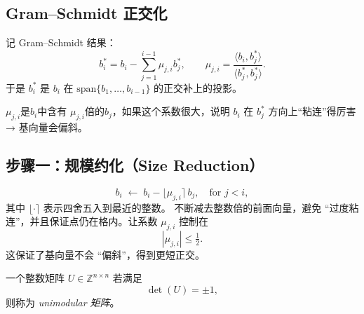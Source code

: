 \subsection*{Gram--Schmidt 正交化}
记 Gram--Schmidt 结果：
\[
b_i^* = b_i - \sum_{j=1}^{i-1} \mu_{j,i} b_j^*, 
\qquad 
\mu_{j,i} = \frac{\langle b_i, b_j^* \rangle}{\langle b_j^*, b_j^* \rangle}.
\]
于是 $b_i^*$ 是 $b_i$ 在 $\mathrm{span}\{b_1,\dots,b_{i-1}\}$ 的正交补上的投影。
\begin{dxtips}
 $\mu_{j,i}$是$b_i$中含有 $\mu_{j,i}$倍的$b_j$，如果这个系数很大，说明 $b_i$ 在 $b_j^*$ 方向上“粘连”得厉害 → 基向量会偏斜。
\end{dxtips}


\subsection*{步骤一：规模约化（Size Reduction）}
\[
b_i \;\leftarrow\; b_i - \lfloor \mu_{j,i} \rceil\, b_j, 
\quad \text{for } j<i,
\]
其中 $\lfloor \cdot \rceil$ 表示四舍五入到最近的整数。 
不断减去整数倍的前面向量，避免 ``过度粘连''，并且保证点仍在格内。让系数 $\mu_{j,i}$ 控制在
\[
|\mu_{j,i}| \leq \tfrac{1}{2}.
\]
这保证了基向量不会 ``偏斜''，得到更短正交。
\begin{definition}[Unimodular 矩阵]
一个整数矩阵 $U \in \mathbb{Z}^{n \times n}$ 若满足
\[
\det(U) = \pm 1,
\]
则称为 \emph{unimodular 矩阵}。
\end{definition}
